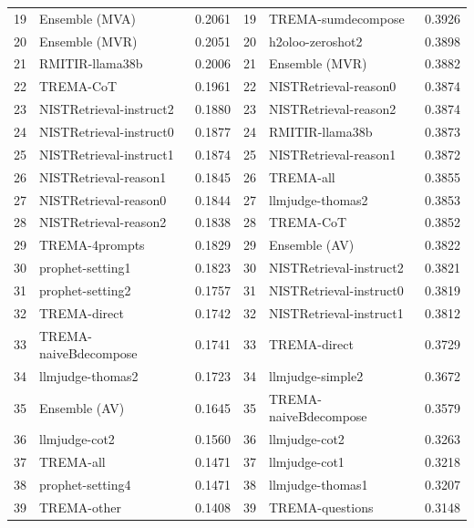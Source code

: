 \begin{table}[h]
\begin{tabular}{rlc|rlc}
\cellcolor{bhtVeryLightGray}19 & \cellcolor{bhtVeryLightGray}Ensemble (MVA) & \cellcolor{bhtVeryLightGray}0.2061 & 19 & TREMA-sumdecompose & 0.3926 \\
\cellcolor{bhtVeryLightGray}20 & \cellcolor{bhtVeryLightGray}Ensemble (MVR) & \cellcolor{bhtVeryLightGray}0.2051 & 20 & h2oloo-zeroshot2 & 0.3898 \\
21 & RMITIR-llama38b & 0.2006 & \cellcolor{bhtVeryLightGray}21 & \cellcolor{bhtVeryLightGray}Ensemble (MVR) & \cellcolor{bhtVeryLightGray}0.3882 \\
22 & TREMA-CoT & 0.1961 & 22 & NISTRetrieval-reason0 & 0.3874 \\
23 & NISTRetrieval-instruct2 & 0.1880 & 23 & NISTRetrieval-reason2 & 0.3874 \\
24 & NISTRetrieval-instruct0 & 0.1877 & 24 & RMITIR-llama38b & 0.3873 \\
25 & NISTRetrieval-instruct1 & 0.1874 & 25 & NISTRetrieval-reason1 & 0.3872 \\
26 & NISTRetrieval-reason1 & 0.1845 & 26 & TREMA-all & 0.3855 \\
27 & NISTRetrieval-reason0 & 0.1844 & 27 & llmjudge-thomas2 & 0.3853 \\
28 & NISTRetrieval-reason2 & 0.1838 & 28 & TREMA-CoT & 0.3852 \\
29 & TREMA-4prompts & 0.1829 & \cellcolor{bhtVeryLightGray}29 & \cellcolor{bhtVeryLightGray}Ensemble (AV) & \cellcolor{bhtVeryLightGray}0.3822 \\
30 & prophet-setting1 & 0.1823 & 30 & NISTRetrieval-instruct2 & 0.3821 \\
31 & prophet-setting2 & 0.1757 & 31 & NISTRetrieval-instruct0 & 0.3819 \\
32 & TREMA-direct & 0.1742 & 32 & NISTRetrieval-instruct1 & 0.3812 \\
33 & TREMA-naiveBdecompose & 0.1741 & 33 & TREMA-direct & 0.3729 \\
34 & llmjudge-thomas2 & 0.1723 & 34 & llmjudge-simple2 & 0.3672 \\
\cellcolor{bhtVeryLightGray}35 & \cellcolor{bhtVeryLightGray}Ensemble (AV) & \cellcolor{bhtVeryLightGray}0.1645 & 35 & TREMA-naiveBdecompose & 0.3579 \\
36 & llmjudge-cot2 & 0.1560 & 36 & llmjudge-cot2 & 0.3263 \\
37 & TREMA-all & 0.1471 & 37 & llmjudge-cot1 & 0.3218 \\
38 & prophet-setting4 & 0.1471 & 38 & llmjudge-thomas1 & 0.3207 \\
39 & TREMA-other & 0.1408 & 39 & TREMA-questions & 0.3148 \\

\end{tabular}
\end{table}
